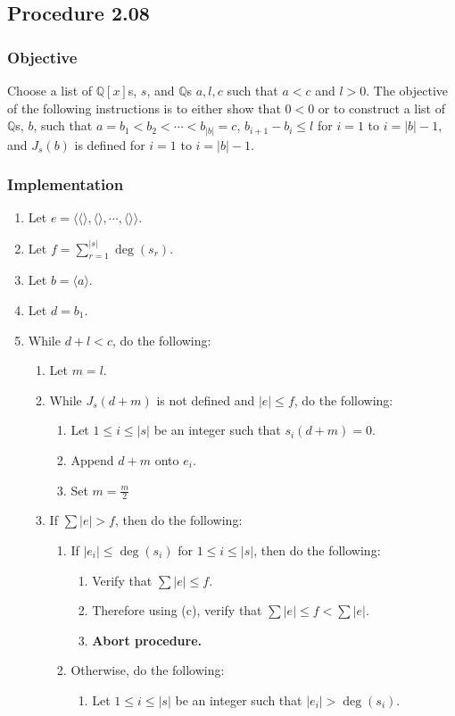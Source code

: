 \documentclass[twocolumn]{article}
\newcommand{\procedure}[2][]{\subsection*{Procedure #2 \ifthenelse{\equal{#1}{}}{}{(#1)}}\label{sec:procedure #2}}
\newcommand{\objective}{\subsubsection*{Objective}}
\newcommand{\implementation}{\subsubsection*{Implementation}}
\begin{document}
		\procedure{2.08}
			\objective
				Choose a list of $\mathbb{Q}[x]$s, $s$, and $\mathbb{Q}$s $a,l,c$ such that $a<c$ and $l>0$. The objective of the following instructions is to either show that $0<0$ or to construct a list of $\mathbb{Q}$s, $b$, such that $a=b_1<b_2<\cdots<b_{\lvert b\rvert}=c$, $b_{i+1}-b_i\le l$ for $i=1$ to $i=\lvert b\rvert-1$, and $J_s(b)$ is defined for $i=1$ to $i=\lvert b\rvert-1$.
			\implementation
				\begin{enumerate}
					\item Let $e=\langle\langle\rangle,\langle\rangle,\cdots,\langle\rangle\rangle$.
					\item Let $f=\sum_{r=1}^{\lvert s\rvert}\deg(s_r)$.
					\item Let $b=\langle a\rangle$.
					\item Let $d=b_1$.
					\item While $d+l<c$, do the following:
					\begin{enumerate}
						\item Let $m=l$.
						\item While $J_s(d+m)$ is not defined and $\lvert e\rvert\le f$, do the following:
						\begin{enumerate}
							\item Let $1\le i\le\lvert s\rvert$ be an integer such that $s_i(d+m)=0$.
							\item Append $d+m$ onto $e_i$.
							\item Set $m=\frac{m}{2}$
						\end{enumerate}
						\item If $\sum\lvert e\rvert>f$, then do the following:
						\begin{enumerate}
							\item If $\lvert e_i\rvert\le\deg(s_i)$ for $1\le i\le\lvert s\rvert$, then do the following:
							\begin{enumerate}
								\item Verify that $\sum\lvert e\rvert\le f$.
								\item Therefore using (c), verify that $\sum\lvert e\rvert\le f<\sum\lvert e\rvert$.
								\item \textbf{Abort procedure.}
							\end{enumerate}
							\item Otherwise, do the following:
							\begin{enumerate}
								\item Let $1\le i\le\lvert s\rvert$ be an integer such that $\lvert e_i\rvert>\deg(s_i)$.

\end{enumerate}
\end{enumerate}
\end{enumerate}
\end{enumerate}
\end{document}
